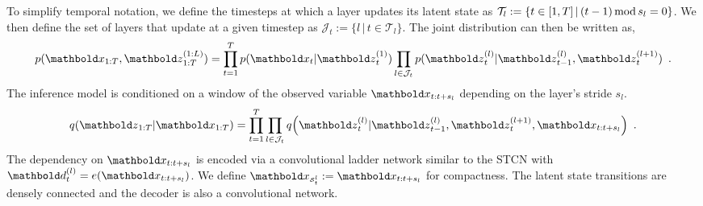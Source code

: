 To simplify temporal notation, we define the timesteps at which a layer updates its latent state as $\mathcal{T}_l := \{t \in {\left[1,T\right]} \,|\, (t-1)\,\text{mod}\, s_l = 0\}$. We then define the set of layers that update at a given timestep as $\mathcal{J}_t := \{ l \,|\, t\in\mathcal{T}_l \}$. The joint distribution can then be written as,
\begin{equation}
    p(\xb_{1:T},\zb_{1:T}^{(1:L)}) = 
    \prod_{t=1}^{T} p(\xb_t | \zb_t^{(1)})
    \prod\limits_{l\in\mathcal{J}_t} p(\zb_t^{(l)} | \zb_{t-1}^{(l)}, \zb_t^{(l+1)}) \enspace . \nonumber
    \label{eq: cwvae joint}
\end{equation}
The inference model is conditioned on a window of the observed variable $\xb_{t:t+s_l}$ depending on the layer's stride $s_l$.
\begin{equation}
    q\pa{\zb_{1:T} | \xb_{1:T}} = \prod_{t=1}^T \prod\limits_{l\in\mathcal{J}_t} q\pa{\zb_t^{(l)} | \zb_{t-1}^{(l)}, \zb_t^{(l+1)}, \xb_{t:t+s_l}} \enspace . \nonumber
    \label{eq: cwvae inference}
\end{equation}
The dependency on $\xb_{t:t+s_l}$ is encoded via a convolutional ladder network similar to the STCN with $\db_t^{(l)} = e(\xb_{t:t+s_l})$. We define $\xb_{\scriptscriptstyle\mathcal{S}_t^l}:=\xb_{t:t+s_l}$ for compactness. The latent state transitions are densely connected and the decoder is also a convolutional network. 
